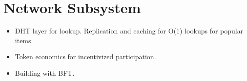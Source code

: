\section{Network Subsystem}
    \begin{itemize}
        \item DHT layer for lookup. Replication and caching for O(1) lookups for popular items.
        \item Token economics for incentivized participation.
        \item Building with BFT. 
    \end{itemize}

